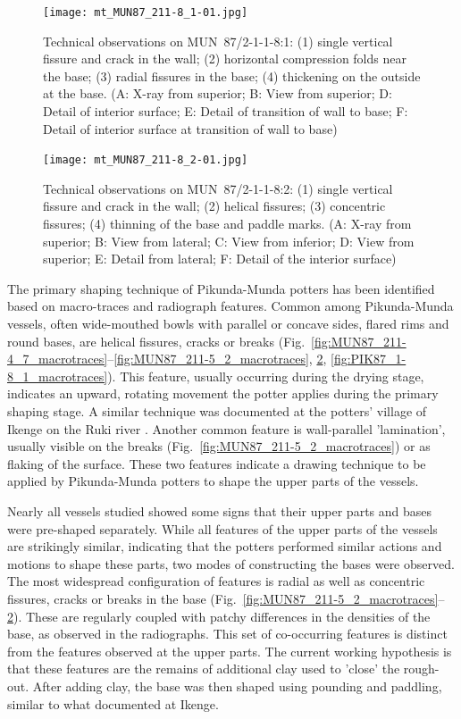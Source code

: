 \documentclass[smallextended,natbib]{svjour3}       %
\begin{document}
\begin{figure}[p]
	\centering
	\texttt{[image: mt\_MUN87\_211-8\_1-01.jpg]}
	\caption{Technical observations on MUN~87/2-1-1-8:1: (1) single vertical fissure and crack in the wall; (2) horizontal compression folds near the base; (3) radial fissures in the base; (4) thickening on the outside at the base. (A: X-ray from superior; B: View from superior; D: Detail of interior surface; E: Detail of transition of wall to base; F: Detail of interior surface at transition of wall to base)}
	\label{fig:MUN87_211-8_1_macrotraces}
\end{figure}

\begin{figure}[p]
	\centering
	\texttt{[image: mt\_MUN87\_211-8\_2-01.jpg]}
	\caption{Technical observations on MUN~87/2-1-1-8:2: (1) single vertical fissure and crack in the wall; (2) helical fissures; (3) concentric fissures; (4) thinning of the base and paddle marks. (A: X-ray from superior; B: View from lateral; C: View from inferior; D: View from superior; E: Detail from lateral; F: Detail of the interior surface)}
	\label{fig:MUN87_211-8_2_macrotraces}
\end{figure}

The primary shaping technique of Pikunda-Munda potters has been identified based on macro-traces and radiograph features. Common among Pikunda-Munda vessels, often wide-mouthed bowls with parallel or concave sides, flared rims and round bases, are helical fissures, cracks or breaks (Fig.~\ref{fig:MUN87_211-4_7_macrotraces}--\ref{fig:MUN87_211-5_2_macrotraces}, \ref{fig:MUN87_211-8_2_macrotraces}, \ref{fig:PIK87_1-8_1_macrotraces}). This feature, usually occurring during the drying stage, indicates an upward, rotating movement the potter applies during the primary shaping stage. A similar technique was documented at the potters' village of Ikenge on the Ruki river \citep[Fig.~\ref{fig:map}; ][]{Eggert.1980c}. Another common feature is wall-parallel 'lamination', usually visible on the breaks (Fig.~\ref{fig:MUN87_211-5_2_macrotraces}) or as flaking of the surface. These two features indicate a drawing technique to be applied by Pikunda-Munda potters to shape the upper parts of the vessels.

Nearly all vessels studied showed some signs that their upper parts and bases were pre-shaped separately. While all features of the upper parts of the vessels are strikingly similar, indicating that the potters performed similar actions and motions to shape these parts, two modes of constructing the bases were observed. The most widespread configuration of features is radial as well as concentric fissures, cracks or breaks in the base (Fig.~\ref{fig:MUN87_211-5_2_macrotraces}--\ref{fig:MUN87_211-8_2_macrotraces}). These are regularly coupled with patchy differences in the densities of the base, as observed in the radiographs. This set of co-occurring features is distinct from the features observed at the upper parts. The current working hypothesis is that these features are the remains of additional clay used to 'close' the rough-out. After adding clay, the base was then shaped using pounding and paddling, similar to what \citet{Eggert.1980c} documented at Ikenge.
\end{document}
